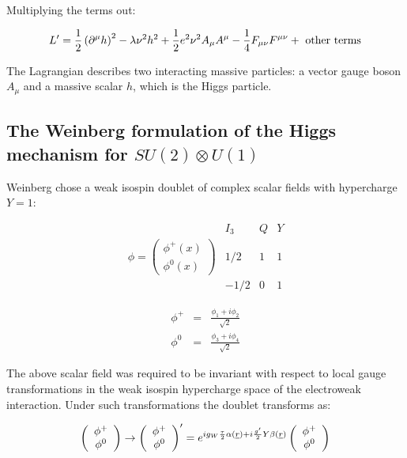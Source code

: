 Multiplying the terms out:

\[
  L' = \frac{1}{2}\left(\partial^{\mu}h\right)^2 - \lambda\nu^2h^2 + \frac{1}{2}e^2\nu^2A_{\mu}A^{\mu} - \frac{1}{4}F_{\mu\nu}F^{\mu\nu} + \textrm{ other terms}
\]

The Lagrangian describes two interacting massive particles: a vector gauge boson $A_{\mu}$ and a massive scalar $h$, which is the Higgs particle.

\subsection[Weinberg formulation of the Higgs mechanism for \texorpdfstring{$SU(2) \otimes U(1)$}{SU2TimesU1}]{The Weinberg formulation of the Higgs mechanism for \texorpdfstring{$SU(2) \otimes U(1)$}{SU2TimesU1}}

Weinberg chose a weak isospin doublet of complex scalar fields with hypercharge $Y = 1$:

\[
  \begin{array}{cccc}
    &
    I_3 & Q & Y \\
    \phi = 
    \left(
    \begin{array}{c}
      \phi^+(x) \\
      \phi^0(x)
    \end{array}
    \right)
    &
    1/2  & 1 & 1 \\
    & -1/2 & 0 & 1
  \end{array}
\]

\begin{eqnarray*}
  \phi^{+} & = & \frac{\phi_1 + i\phi_2}{\sqrt{2}} \\
  \phi^{0} & = & \frac{\phi_3 + i\phi_4}{\sqrt{2}}
\end{eqnarray*}

The above scalar field was required to be invariant with respect to local gauge transformations in the weak isospin hypercharge space of the electroweak interaction.  Under such transformations the doublet transforms as:

\[
  \left(
  \begin{array}{c}
    \phi^+ \\
    \phi^0
  \end{array}
  \right)
  \to
  \left(
  \begin{array}{c}
    \phi^+ \\
    \phi^0
  \end{array}
  \right)'
  =
  e^{ig_W\frac{\tau}{2}\alpha(\underline{r}) + i\frac{g'}{2}Y\beta(\underline{r})}
  \left(
  \begin{array}{c}
    \phi^+ \\
    \phi^0
  \end{array}
  \right)
\]

